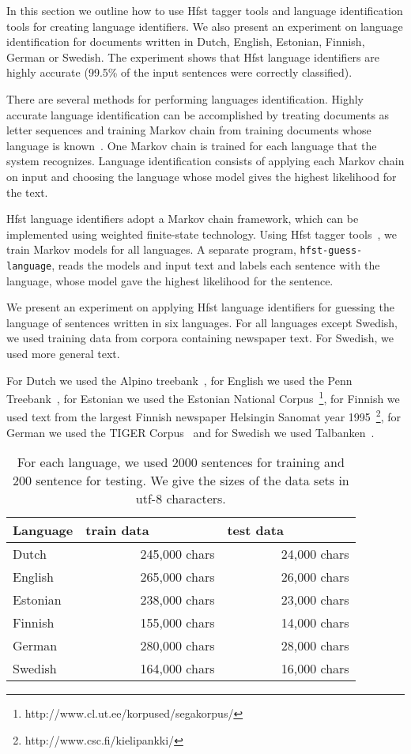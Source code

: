 \documentclass{llncs}
\begin{document}
In this section we outline how to use Hfst tagger tools and language
identification tools for creating language identifiers. We also
present an experiment on language identification for documents written
in Dutch, English, Estonian, Finnish, German or Swedish. The
experiment shows that Hfst language identifiers are highly accurate
(99.5\% of the input sentences were correctly classified).

There are several methods for performing languages
identification. Highly accurate language identification can be
accomplished by treating documents as letter sequences and training
Markov chain from training documents whose language is
known~\cite{cavnar/1994}. One Markov chain is trained for each
language that the system recognizes. Language identification consists
of applying each Markov chain on input and choosing the language whose
model gives the highest likelihood for the text. 

Hfst language identifiers adopt a Markov chain framework, which can be
implemented using weighted finite-state technology. Using Hfst tagger
tools~\cite{silfverberg/2011}, we train Markov models for all
languages. A separate program, {\tt hfst-guess-language}, reads the
models and input text and labels each sentence with the language,
whose model gave the highest likelihood for the sentence.

We present an experiment on applying Hfst language identifiers for
guessing the language of sentences written in six languages. For all
languages except Swedish, we used training data from corpora
containing newspaper text. For Swedish, we used more general text.

For Dutch we used the Alpino treebank~\cite{bouma/2000}, for English
we used the Penn Treebank~\cite{marcus/1993}, for Estonian we used the
Estonian National
Corpus~\footnote{http://www.cl.ut.ee/korpused/segakorpus/}, for
Finnish we used text from the largest Finnish newspaper Helsingin
Sanomat year 1995~\footnote{http://www.csc.fi/kielipankki/}, for
German we used the TIGER Corpus~\cite{brants/2002} and for Swedish we
used Talbanken~\cite{einarsson/1976}.

\begin{table}
\begin{center}
\begin{tabular}{l|rr}
Language & train data~~~~~~~~~ & test data~~~~~~~~~\\
\hline
Dutch    & 245,000 chars  & 24,000 chars\\
English  & 265,000 chars  & 26,000 chars\\
Estonian & 238,000 chars  & 23,000 chars\\
Finnish  & 155,000 chars  & 14,000 chars\\
German   & 280,000 chars  & 28,000 chars\\
Swedish  & 164,000 chars  & 16,000 chars\\
\end{tabular}
\caption{For each language, we used 2000 sentences for training and
  200 sentence for testing. We give the sizes of the data sets in
  utf-8 characters.}\label{tab:lang-id-data}
\end{center}
\end{table}
\end{document}
